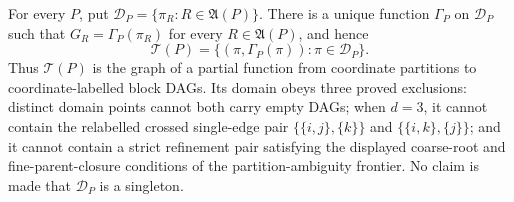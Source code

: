 For every \(P\), put \(\mathcal D_P=\{\pi_R:R\in\mathfrak A(P)\}\). There is a unique function \(\Gamma_P\) on \(\mathcal D_P\) such that \(G_R=\Gamma_P(\pi_R)\) for every \(R\in\mathfrak A(P)\), and hence \[\mathcal T(P)=\{(\pi,\Gamma_P(\pi)):\pi\in\mathcal D_P\}.\] Thus \(\mathcal T(P)\) is the graph of a partial function from coordinate partitions to coordinate-labelled block DAGs. Its domain obeys three proved exclusions: distinct domain points cannot both carry empty DAGs; when \(d=3\), it cannot contain the relabelled crossed single-edge pair \(\{\{i,j\},\{k\}\}\) and \(\{\{i,k\},\{j\}\}\); and it cannot contain a strict refinement pair satisfying the displayed coarse-root and fine-parent-closure conditions of the partition-ambiguity frontier. No claim is made that \(\mathcal D_P\) is a singleton.